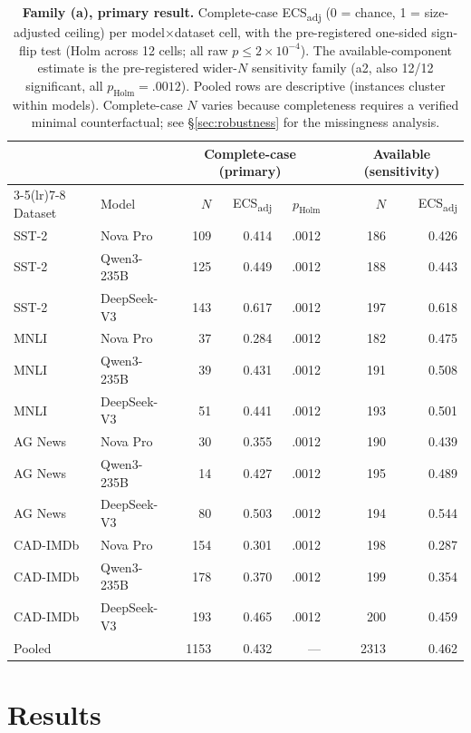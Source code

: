 \documentclass[11pt]{article}
\newcommand{\ecsadj}{\mbox{ECS\textsubscript{adj}}}
\newcommand{\holm}[1]{$p_{\mathrm{Holm}}{=}#1$}
\begin{document}
\begin{table}[t]
\centering
\small
\begin{tabular}{llrrrlrr}
\toprule
& & \multicolumn{3}{c}{Complete-case (primary)} & & \multicolumn{2}{c}{Available (sensitivity)} \\
\cmidrule(lr){3-5}\cmidrule(lr){7-8}
Dataset & Model & $N$ & \ecsadj & $p_{\mathrm{Holm}}$ & & $N$ & \ecsadj \\
\midrule
SST-2   & Nova Pro    & 109 & 0.414 & .0012 & & 186 & 0.426 \\
SST-2   & Qwen3-235B  & 125 & 0.449 & .0012 & & 188 & 0.443 \\
SST-2   & DeepSeek-V3 & 143 & 0.617 & .0012 & & 197 & 0.618 \\
MNLI    & Nova Pro    &  37 & 0.284 & .0012 & & 182 & 0.475 \\
MNLI    & Qwen3-235B  &  39 & 0.431 & .0012 & & 191 & 0.508 \\
MNLI    & DeepSeek-V3 &  51 & 0.441 & .0012 & & 193 & 0.501 \\
AG News & Nova Pro    &  30 & 0.355 & .0012 & & 190 & 0.439 \\
AG News & Qwen3-235B  &  14 & 0.427 & .0012 & & 195 & 0.489 \\
AG News & DeepSeek-V3 &  80 & 0.503 & .0012 & & 194 & 0.544 \\
CAD-IMDb & Nova Pro   & 154 & 0.301 & .0012 & & 198 & 0.287 \\
CAD-IMDb & Qwen3-235B & 178 & 0.370 & .0012 & & 199 & 0.354 \\
CAD-IMDb & DeepSeek-V3 & 193 & 0.465 & .0012 & & 200 & 0.459 \\
\midrule
Pooled  &             & 1153 & 0.432 & --- & & 2313 & 0.462 \\
\bottomrule
\end{tabular}
\caption{\textbf{Family (a), primary result.} Complete-case \ecsadj{} (0 = chance, 1 = size-adjusted ceiling) per model$\times$dataset cell, with the pre-registered one-sided sign-flip test (Holm across 12 cells; all raw $p\le 2\times10^{-4}$). The available-component estimate is the pre-registered wider-$N$ sensitivity family (a2, also 12/12 significant, all \holm{.0012}). Pooled rows are descriptive (instances cluster within models). Complete-case $N$ varies because completeness requires a verified minimal counterfactual; see \S\ref{sec:robustness} for the missingness analysis.}
\label{tab:primary}
\end{table}

\section{Results}
\label{sec:results}
\end{document}
